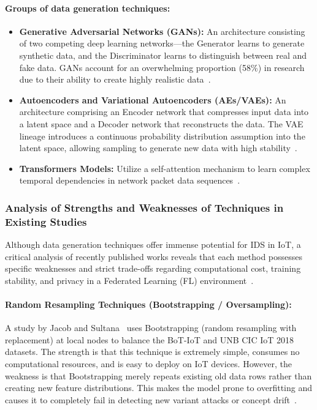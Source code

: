 \paragraph{Groups of data generation techniques:}
\begin{itemize}
    \item \textbf{Generative Adversarial Networks (GANs):} An architecture consisting of two competing deep learning networks---the Generator learns to generate synthetic data, and the Discriminator learns to distinguish between real and fake data. GANs account for an overwhelming proportion (58\%) in research due to their ability to create highly realistic data~\cite{deng2025}.
    \item \textbf{Autoencoders and Variational Autoencoders (AEs/VAEs):} An architecture comprising an Encoder network that compresses input data into a latent space and a Decoder network that reconstructs the data. The VAE lineage introduces a continuous probability distribution assumption into the latent space, allowing sampling to generate new data with high stability~\cite{deng2025}.
    \item \textbf{Transformers Models:} Utilize a self-attention mechanism to learn complex temporal dependencies in network packet data sequences~\cite{deng2025}.
\end{itemize}

\subsubsection{Analysis of Strengths and Weaknesses of Techniques in Existing Studies}
Although data generation techniques offer immense potential for IDS in IoT, a critical analysis of recently published works reveals that each method possesses specific weaknesses and strict trade-offs regarding computational cost, training stability, and privacy in a Federated Learning (FL) environment~\cite{deng2025}.

\paragraph{Random Resampling Techniques (Bootstrapping / Oversampling):}
A study by Jacob and Sultana~\cite{jacob2026} uses Bootstrapping (random resampling with replacement) at local nodes to balance the BoT-IoT and UNB CIC IoT 2018 datasets. The strength is that this technique is extremely simple, consumes no computational resources, and is easy to deploy on IoT devices. However, the weakness is that Bootstrapping merely repeats existing old data rows rather than creating new feature distributions. This makes the model prone to overfitting and causes it to completely fail in detecting new variant attacks or concept drift~\cite{deng2025}.

